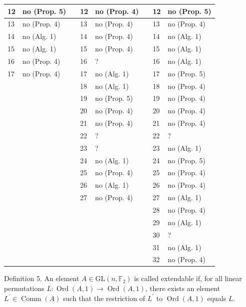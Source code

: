 \documentclass[10pt]{article}
\begin{document}
\begin{table}[h]
\begin{center}
\begin{tabular}{|l|l|l|l|l|l|l|l|}
\hline
12 & no (Prop. 5) &  & 12 & no (Prop. 4) &  & 12 & no (Prop. 5) \\
\hline
13 & no (Prop. 4) &  & 13 & no (Prop. 4) &  & 13 & no (Prop. 4) \\
\hline
14 & no (Alg. 1) &  & 14 & no (Prop. 4) &  & 14 & no (Alg. 1) \\
\hline
15 & no (Alg. 1) &  & 15 & no (Prop. 4) &  & 15 & no (Alg. 1) \\
\hline
16 & no (Prop. 4) &  & 16 & ? &  & 16 & no (Alg. 1) \\
\hline
17 & no (Prop. 4) &  & 17 & no (Alg. 1) &  & 17 & no (Prop. 5) \\
\hline
 &  &  & 18 & no (Alg. 1) &  & 18 & no (Prop. 4) \\
\hline
 &  &  & 19 & no (Prop. 5) &  & 19 & no (Prop. 4) \\
\hline
 &  &  & 20 & no (Prop. 4) &  & 20 & no (Prop. 4) \\
\hline
 &  &  & 21 & no (Prop. 4) &  & 21 & no (Prop. 4) \\
\hline
 &  &  & 22 & ? &  & 22 & ? \\
\hline
 &  &  & 23 & ? &  & 23 & no (Alg. 1) \\
\hline
 &  &  & 24 & no (Alg. 1) &  & 24 & no (Prop. 5) \\
\hline
 &  &  & 25 & no (Prop. 4) &  & 25 & no (Prop. 4) \\
\hline
 &  &  & 26 & no (Alg. 1) &  & 26 & no (Prop. 4) \\
\hline
 &  &  & 27 & no (Prop. 4) &  & 27 & no (Alg. 1) \\
\hline
 &  &  &  &  &  & 28 & no (Prop. 4) \\
\hline
 &  &  &  &  &  & 29 & no (Alg. 1) \\
\hline
 &  &  &  &  &  & 30 & ? \\
\hline
 &  &  &  &  &  & 31 & no (Alg. 1) \\
\hline
 &  &  &  &  &  & 32 & no (Prop. 4) \\
\hline
\end{tabular}
\end{center}
\end{table}

Definition 5. An element $A \in \mathrm{GL}\left(n, \mathbb{F}_{2}\right)$ is called extendable if, for all linear permutations $L: \operatorname{Ord}(A, 1) \rightarrow \operatorname{Ord}(A, 1)$, there exists an element $L^{\prime} \in \operatorname{Comm}(A)$ such that the restriction of $L^{\prime}$ to $\operatorname{Ord}(A, 1)$ equals $L$.
\end{document}
